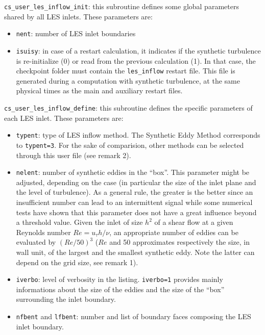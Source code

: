 {{{\texttt{cs\_user\_les\_inflow\_init}: this subroutine defines
some global parameters shared by all LES inlets. These parameters are:

\begin{itemize}
\item \texttt{nent}: number of LES inlet boundaries
\item \texttt{isuisy}: in case of a restart calculation, it indicates if
  the synthetic turbulence is re-initialize (0) or read from the
  previous calculation (1). In that case, the checkpoint folder must
  contain the \texttt{les\_inflow} restart file. This file is
  generated during a computation with synthetic turbulence, at the
  same physical times as the main and auxiliary restart files.
\end{itemize}

\texttt{cs\_user\_les\_inflow\_define}: this subroutine defines
the specific parameters of each LES inlet. These parameters are:

\begin{itemize}
\item \texttt{typent}: type of LES inflow method. The Synthetic Eddy
  Method corresponds to \texttt{typent=3}. For the sake of
  comparision, other methods can be selected through this user file
  (see remark 2).

\item \texttt{nelent}: number of synthetic eddies in the ``box''. This
  parameter might be adjusted, depending on the case (in particular
  the size of the inlet plane and the level of turbulence). As a
  general rule, the greater is the better since an insufficient number
  can lead to an intermittent signal while some numerical tests have
  shown that this parameter does not have a great influence beyond a
  threshold value. Given the inlet of size $h^2$ of a shear flow at a
  given Reynolds number $Re=u_\tau h/\nu$, an appropriate number of
  eddies can be evaluated by $(Re/50)^3$ ($Re$ and 50 approximates
  respectively the size, in wall unit, of the largest and the smallest
  synthetic eddy. Note the latter can depend on the grid size, see
  remark 1).

\item \texttt{iverbo}: level of verbosity in the
  listing. \texttt{iverbo=1} provides mainly informations about the
  size of the eddies and the size of the ``box'' surrounding the inlet
  boundary.

\item \texttt{nfbent} and \texttt{lfbent}: number and list of boundary
  faces composing the LES inlet boundary.


\end{itemize}}}}
